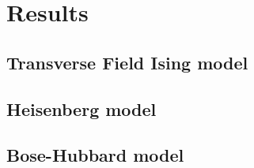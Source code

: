
\chapter{Results}
\label{chapter4}

\ifpdf
    \graphicspath{{Chapter4/Figs/Raster/}{Chapter4/Figs/PDF/}{Chapter4/Figs/}}
\else
    \graphicspath{{Chapter4/Figs/Vector/}{Chapter4/Figs/}}
\fi

\section{Transverse Field Ising model}
\label{sec:res-im}

\section{Heisenberg model}
\label{sec:res-hm}

\section{Bose-Hubbard model}
\label{sec:res-bhm}